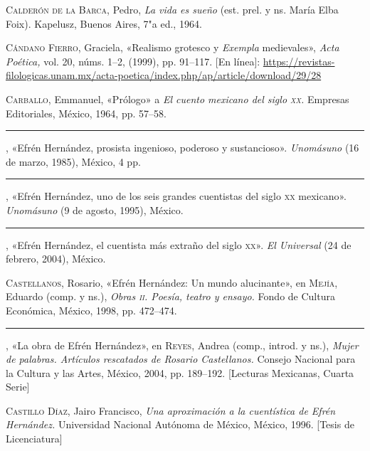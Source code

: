 \documentclass[14pt,twoside,final]{extbook} %
\begin{document}
\textsc{Calderón de la Barca}, Pedro, \emph{La vida es sueño} (est. prel. y ns. María Elba Foix). Kapelusz, Buenos Aires, 7"a ed., 1964.\label{bib:calderon1964}

\begin{sloppypar}
\textsc{Cándano Fierro}, Graciela, «Realismo grotesco y \emph{Exempla} medievales», \emph{Acta Poética,} vol. 20, núms. 1--2, (1999), pp. 91--117. [En línea]: \url{https://revistas-filologicas.unam.mx/acta-poetica/index.php/ap/article/download/29/28}
\end{sloppypar}
\label{bib:candano1999}

\textsc{Carballo}, Emmanuel, «Prólogo» a \emph{El cuento mexicano del siglo \textsc{xx}.} Empresas Editoriales, México, 1964, pp. 57--58.\label{bib:carballo1964}

\rule{1cm}{0.4pt}, «Efrén Hernández, prosista ingenioso, poderoso y sustancioso». \emph{Unomásuno} (16 de marzo, 1985), México, 4 pp.\label{bib:carballo1985}

\rule{1cm}{0.4pt}, «Efrén Hernández, uno de los seis grandes cuentistas del siglo \textsc{xx} mexicano». \emph{Unomásuno} (9 de agosto, 1995), México.\label{bib:carballo1995}

\rule{1cm}{0.4pt}, «Efrén Hernández, el cuentista más extraño del siglo \textsc{xx}». \emph{El Universal} (24 de febrero, 2004), México.\label{bib:carballo2004}

\textsc{Castellanos}, Rosario, «Efrén Hernández: Un mundo alucinante», en \textsc{Mejía}, Eduardo (comp. y ns.), \emph{Obras \textsc{ii}. Poesía, teatro y ensayo.} Fondo de Cultura Económica, México, 1998, pp. 472--474.\label{bib:castellanos1998}

\rule{1cm}{0.4pt}, «La obra de Efrén Hernández», en \textsc{Reyes}, Andrea (comp., introd. y ns.), \emph{Mujer de palabras. Artículos rescatados de Rosario Castellanos.} Consejo Nacional para la Cultura y las Artes, México, 2004, pp. \mbox{189--192}. [Lecturas Mexicanas, Cuarta Serie]\label{bib:castellanos2004}

\textsc{Castillo Díaz}, Jairo Francisco, \emph{Una aproximación a la cuentística de Efrén Hernández.} Universidad Nacional Autónoma de México, México, 1996. [Tesis de Licenciatura]\label{bib:castillo1996}
\end{document}
